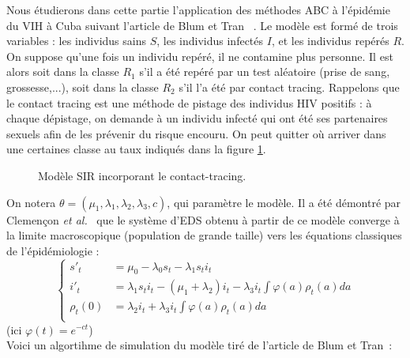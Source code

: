 \documentclass{article}
\theoremstyle{definition}
\begin{document}
Nous étudierons dans cette partie l'application des méthodes ABC à l'épidémie du VIH à Cuba suivant l'article de Blum et Tran ~\cite{BlumTran}. Le modèle est formé de trois variables : les individus sains $S$, les individus infectés $I$, et les individus repérés $R$. On suppose qu'une fois un individu repéré, il ne contamine plus personne. Il est alors soit dans la classe $R_1$ s'il a été repéré par un test aléatoire (prise de sang, grossesse,...), soit dans la classe $R_2$ s'il l'a été par contact tracing. Rappelons que le contact tracing est une méthode de pistage des individus HIV positifs : à chaque dépistage, on demande à un individu infecté qui ont été ses partenaires sexuels afin de les prévenir du risque encouru. On peut quitter où arriver dans une certaines classe au taux indiqués dans la figure \ref{SIR}.\\
\begin{figure}[!h]\centering
{}
\caption{Modèle SIR incorporant le contact-tracing.}
\label{SIR}
\end{figure}

On notera $\theta=(\mu_1,\lambda_1,\lambda_2,\lambda_3,c)$, qui paramètre le modèle. Il a été démontré par Clemençon \textit{et al.}~\cite{Clemencon} que le système d'EDS obtenu à partir de ce modèle converge à la limite macroscopique (population de grande taille) vers les équations classiques de l'épidémiologie :
\[\left\{\begin{array}{rl} s'_t& = \mu_0-\lambda_0 s_t -\lambda_1 s_t i_t \\
                       i'_t  & =\lambda_1 s_t i_t -(\mu_1+\lambda_2)i_t -\lambda_3i_t\int \varphi (a) \rho_t(a) da \\
		\rho_t(0) &= \lambda_2 i_t +\lambda_3 i_t \int \varphi (a) \rho_t(a) da  \\
\end{array}\right.\]
(ici $\varphi(t)=e^{-ct}$)\\

Voici un algortihme de simulation du modèle tiré de l'article de Blum et Tran~\cite{BlumTran}:\\
\end{document}
